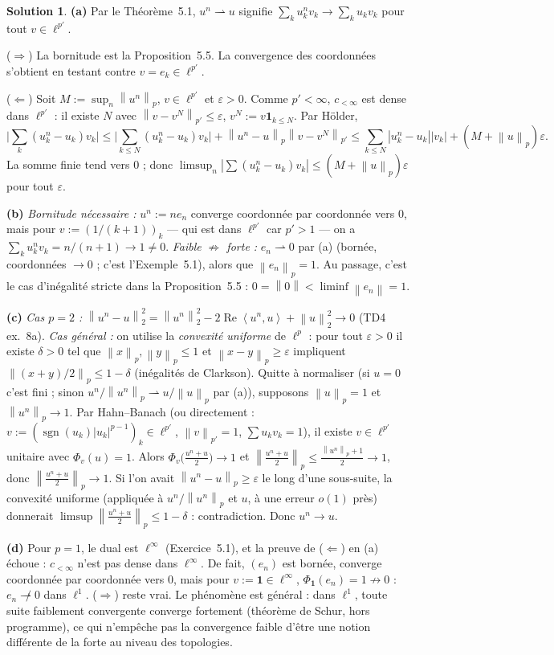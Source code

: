 \documentclass[11pt,a4paper]{article}
\newcommand{\norm}[1]{\left\|#1\right\|}
\DeclareMathOperator{\sgn}{sgn}
\newcommand{\ps}[2]{\left\langle #1,#2\right\rangle}
\renewcommand{\Re}{\operatorname{Re}}
\theoremstyle{definition}
\newtheorem*{solution}{Solution}
\begin{document}
\begin{solution}
\noindent\textbf{(a)} Par le Théorème~5.1, $u^n\rightharpoonup u$ signifie $\sum_ku^n_kv_k\to\sum_ku_kv_k$ pour tout $v\in\ell^{p'}$.

($\Rightarrow$) La bornitude est la Proposition~5.5. La convergence des coordonnées s'obtient en testant contre $v=e_k\in\ell^{p'}$.

($\Leftarrow$) Soit $M:=\sup_n\norm{u^n}_p$, $v\in\ell^{p'}$ et $\varepsilon>0$. Comme $p'<\infty$, $c_{<\infty}$ est dense dans $\ell^{p'}$ : il existe $N$ avec $\norm{v-v^N}_{p'}\le\varepsilon$, $v^N:=v\mathbf 1_{k\le N}$. Par Hölder,
\[
\Big|\sum_k(u^n_k-u_k)v_k\Big|\le\Big|\sum_{k\le N}(u^n_k-u_k)v_k\Big|+\norm{u^n-u}_p\norm{v-v^N}_{p'}\le\sum_{k\le N}|u^n_k-u_k||v_k|+(M+\norm u_p)\varepsilon .
\]
La somme finie tend vers $0$ ; donc $\limsup_n|\sum(u^n_k-u_k)v_k|\le(M+\norm u_p)\varepsilon$ pour tout $\varepsilon$.

\medskip
\noindent\textbf{(b)} \emph{Bornitude nécessaire :} $u^n:=ne_n$ converge coordonnée par coordonnée vers $0$, mais pour $v:=(1/(k+1))_k$ — qui est dans $\ell^{p'}$ car $p'>1$ — on a $\sum_ku^n_kv_k=n/(n+1)\to1\ne0$. \emph{Faible $\not\Rightarrow$ forte :} $e_n\rightharpoonup0$ par (a) (bornée, coordonnées $\to0$ ; c'est l'Exemple~5.1), alors que $\norm{e_n}_p=1$. Au passage, c'est le cas d'inégalité stricte dans la Proposition~5.5 : $0=\norm0<\liminf\norm{e_n}=1$.

\medskip
\noindent\textbf{(c)} \emph{Cas $p=2$ :} $\norm{u^n-u}_2^2=\norm{u^n}_2^2-2\Re\ps{u^n}u+\norm u_2^2\to0$ (TD4 ex.~8a). \emph{Cas général :} on utilise la \emph{convexité uniforme} de $\ell^p$ : pour tout $\varepsilon>0$ il existe $\delta>0$ tel que $\norm x_p,\norm y_p\le1$ et $\norm{x-y}_p\ge\varepsilon$ impliquent $\norm{(x+y)/2}_p\le1-\delta$ (inégalités de Clarkson). Quitte à normaliser (si $u=0$ c'est fini ; sinon $u^n/\norm{u^n}_p\rightharpoonup u/\norm u_p$ par (a)), supposons $\norm u_p=1$ et $\norm{u^n}_p\to1$. Par Hahn--Banach (ou directement : $v:=(\sgn(u_k)|u_k|^{p-1})_k\in\ell^{p'}$, $\norm v_{p'}=1$, $\sum u_kv_k=1$), il existe $v\in\ell^{p'}$ unitaire avec $\Phi_v(u)=1$. Alors $\Phi_v\big(\frac{u^n+u}2\big)\to1$ et $\norm{\frac{u^n+u}2}_p\le\frac{\norm{u^n}_p+1}2\to1$, donc $\norm{\frac{u^n+u}2}_p\to1$. Si l'on avait $\norm{u^n-u}_p\ge\varepsilon$ le long d'une sous-suite, la convexité uniforme (appliquée à $u^n/\norm{u^n}_p$ et $u$, à une erreur $o(1)$ près) donnerait $\limsup\norm{\frac{u^n+u}2}_p\le1-\delta$ : contradiction. Donc $u^n\to u$.

\medskip
\noindent\textbf{(d)} Pour $p=1$, le dual est $\ell^\infty$ (Exercice~5.1), et la preuve de ($\Leftarrow$) en (a) échoue : $c_{<\infty}$ n'est pas dense dans $\ell^\infty$. De fait, $(e_n)$ est bornée, converge coordonnée par coordonnée vers $0$, mais pour $v:=\mathbf 1\in\ell^\infty$, $\Phi_{\mathbf 1}(e_n)=1\not\to0$ : $e_n\not\rightharpoonup0$ dans $\ell^1$. ($\Rightarrow$) reste vrai. Le phénomène est général : dans $\ell^1$, toute suite faiblement convergente converge fortement (théorème de Schur, hors programme), ce qui n'empêche pas la convergence faible d'être une notion différente de la forte au niveau des topologies.
\end{solution}
\end{document}
